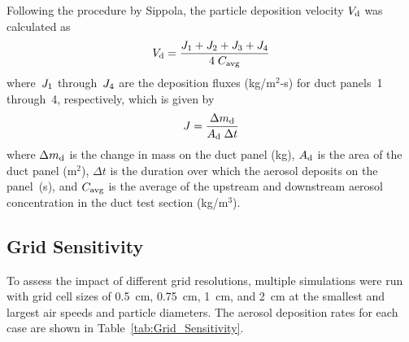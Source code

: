 Following the procedure by Sippola, the particle deposition velocity $V\sb{d}$ was calculated as
\begin{equation}
V\sb{d} = \frac{J\sb{1} + J\sb{2} + J\sb{3} + J\sb{4}}{4 \; C\sb{avg}}
\label{eq:sippola_deposition_velocity}
\end{equation}
where~$J\sb{1}$ through~$J\sb{4}$ are the deposition fluxes (kg/m$^2$-s) for duct panels~1 through~4, respectively, which is given by
\begin{equation}
J = \frac{\Delta m\sb{d}}{A\sb{d} \; \Delta t}
\label{eq:sippola_deposition_flux}
\end{equation}
where $\Delta m\sb{d}$ is the change in mass on the duct panel (kg), $A\sb{d}$ is the area of the duct panel (m$^2$), $\Delta t$ is the duration over which the aerosol deposits on the panel~(s), and $C\sb{avg}$ is the average of the upstream and downstream aerosol concentration in the duct test section (kg/m$^3$).

\subsection{Grid Sensitivity}
\label{sec:Grid_Sensitivity}

To assess the impact of different grid resolutions, multiple simulations were run with grid cell sizes of 0.5~cm, 0.75~cm, 1~cm, and 2~cm at the smallest and largest air speeds and particle diameters. The aerosol deposition rates for each case are shown in Table~\ref{tab:Grid_Sensitivity}.

